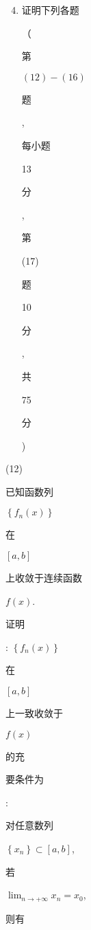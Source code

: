 \documentclass[10pt]{article}
\begin{document}
\begin{enumerate}
  \setcounter{enumi}{3}
  \item \begin{CJK}{UTF8}{mj}证明下列各题\end{CJK}（\begin{CJK}{UTF8}{mj}第\end{CJK} $(12)-(16)$ \begin{CJK}{UTF8}{mj}题\end{CJK}, \begin{CJK}{UTF8}{mj}每小题\end{CJK} 13 \begin{CJK}{UTF8}{mj}分\end{CJK}, \begin{CJK}{UTF8}{mj}第\end{CJK} (17) \begin{CJK}{UTF8}{mj}题\end{CJK} 10 \begin{CJK}{UTF8}{mj}分\end{CJK}, \begin{CJK}{UTF8}{mj}共\end{CJK} 75 \begin{CJK}{UTF8}{mj}分\end{CJK})
\end{enumerate}
(12) \begin{CJK}{UTF8}{mj}已知函数列\end{CJK} $\left\{f_{n}(x)\right\}$ \begin{CJK}{UTF8}{mj}在\end{CJK} $[a, b]$ \begin{CJK}{UTF8}{mj}上收敛于连续函数\end{CJK} $f(x)$. \begin{CJK}{UTF8}{mj}证明\end{CJK}: $\left\{f_{n}(x)\right\}$ \begin{CJK}{UTF8}{mj}在\end{CJK} $[a, b]$ \begin{CJK}{UTF8}{mj}上一致收敛于\end{CJK} $f(x)$ \begin{CJK}{UTF8}{mj}的充\end{CJK} \begin{CJK}{UTF8}{mj}要条件为\end{CJK}: \begin{CJK}{UTF8}{mj}对任意数列\end{CJK} $\left\{x_{n}\right\} \subset[a, b]$, \begin{CJK}{UTF8}{mj}若\end{CJK} $\lim _{n \rightarrow+\infty} x_{n}=x_{0}$, \begin{CJK}{UTF8}{mj}则有\end{CJK}
\end{document}
